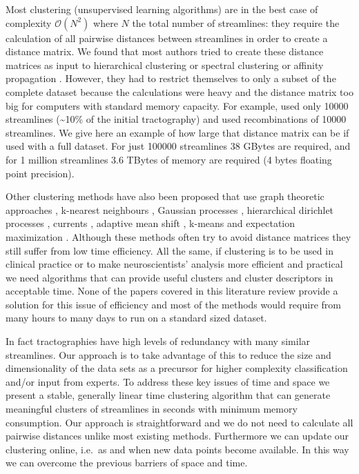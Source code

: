 \documentclass{bioinfo}
\begin{document}
Most clustering (unsupervised learning algorithms) are in the best case
of complexity $\mathcal{O}(N^2)$ where $N$ the total number of
streamlines: they require the calculation of all pairwise distances
between streamlines in order to create a distance matrix. We found that
most authors tried to create these distance matrices as input to
hierarchical clustering \citep[see][]{ moberts2005evaluation,
  zhang2005dti, Tsai2007, zhang2008identifying, jianu2009exploring,
  Visser2010, Guevara2010, Guevara12} or spectral clustering
\citep[see][]{ODonnell_IEEETMI07, o2009tract, jonasson2005fiber,
  ziyan2009consistency} or affinity propagation
\citep[see][]{leemans17new, malcolm2009filtered}. However, they had to
restrict themselves to only a subset of the complete dataset because the
calculations were heavy and the distance matrix too big for computers
with standard memory capacity. For example, \citet{ODonnell_IEEETMI07}
used only \num{10000} streamlines (\textasciitilde 10\% of the initial
tractography) and \citet{Visser2010} used recombinations of \num{10000}
streamlines.  We give here an example of how large that distance matrix
can be if used with a full dataset. For just \num{100000} streamlines 38
GBytes are required, and for 1 million streamlines 3.6 TBytes of memory
are required (4 bytes floating point precision).

Other clustering methods have also been proposed that use graph
theoretic approaches \citep[see][]{brun2004clustering,
  gerig2004analysis, ElKouby2005}, k-nearest neighbours
\citep[see][]{Ding2003a, moberts2005evaluation}, Gaussian processes
\citep[see][]{wassermann2010unsupervised}, hierarchical dirichlet
processes \citep[see][]{wang2010tractography}, currents
\citep[see][]{Durrleman2009, durrleman2010registration}, adaptive mean
shift \citep[see][]{zvitia2008adaptive, Zvitia2010}, k-means
\citep[see][]{ElKouby2005} and expectation maximization
\citep[see][]{Maddah_IEEEBI2008}. Although these methods often try to
avoid distance matrices they still suffer from low time efficiency. All
the same, if clustering is to be used in clinical practice or to make
neuroscientists' analysis more efficient and practical we need
algorithms that can provide useful clusters and cluster descriptors in
acceptable time. None of the papers covered in this literature review
provide a solution for this issue of efficiency and most of the methods
would require from many hours to many days to run on a standard sized
dataset.

In fact tractographies have high levels of redundancy with many similar
streamlines. Our approach is to take advantage of this to reduce the
size and dimensionality of the data sets as a precursor for higher
complexity classification and/or input from experts. To address these
key issues of time and space we present a stable, generally linear time
clustering algorithm that can generate meaningful clusters of
streamlines in seconds with minimum memory consumption. Our approach is
straightforward and we do not need to calculate all pairwise distances
unlike most existing methods. Furthermore we can update our clustering
online, i.e.~as and when new data points become available. In this way
we can overcome the previous barriers of space and time.
\end{document}
